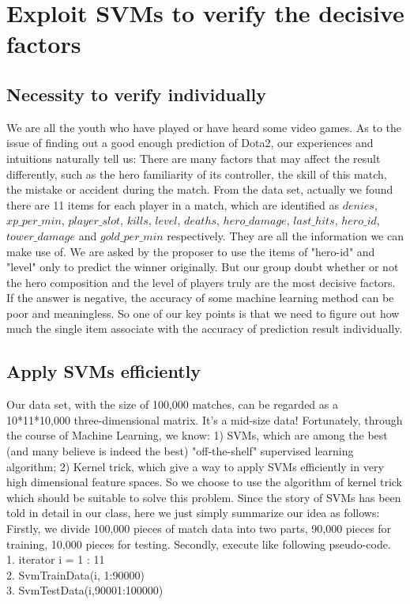 \documentclass[a4paper, 11pt]{article} %
\begin{document}
\section{Exploit SVMs to verify the decisive factors}

\subsection{Necessity to verify individually}
We are all the youth who have played or have heard some video games. As to the issue of finding out a good enough prediction of Dota2, our experiences and intuitions naturally tell us: There are many factors that may affect the result differently, such as the hero familiarity of its controller, the skill of this match, the mistake or accident during the match. 
From the data set, actually we found there are 11 items for each player in a match, which are identified as $denies$, $xp\_per\_min$, $player\_slot$, $kills$, $level$, $deaths$, $hero\_damage$, $last\_hits$, $hero\_id$, $tower\_damage$ and $gold\_per\_min$ respectively. They are all the information we can make use of. We are asked by the proposer to use the items of "hero-id" and "level" only to predict the winner originally. But our group doubt whether or not the hero composition and the level of players truly are the most decisive factors. If the answer is negative, the accuracy of some machine learning method can be poor and meaningless. So one of our key points is that we need to figure out how much the single item associate with the accuracy of prediction result individually.


\subsection{Apply SVMs efficiently}
Our data set, with the size of 100,000 matches, can be regarded as a 10*11*10,000 three-dimensional matrix. It's a mid-size data! Fortunately, through the course of Machine Learning, we know: 1) SVMs, which are among the best (and many believe is indeed the best) "off-the-shelf" supervised learning algorithm; 2) Kernel trick, which give a way to apply SVMs efficiently in very high dimensional feature spaces. So we choose to use the algorithm of kernel trick which should be suitable to solve this problem.
Since the story of SVMs has been told in detail in our class, here we just simply summarize our idea as follows: 
Firstly, we divide 100,000 pieces of match data into two parts, 90,000 pieces for training, 10,000 pieces for testing. 
Secondly, execute like following pseudo-code.\\
1.	iterator  i = 1 : 11  \\
2.	SvmTrainData(i, 1:90000)\\
3.	SvmTestData(i,90001:100000)\\
\end{document}
